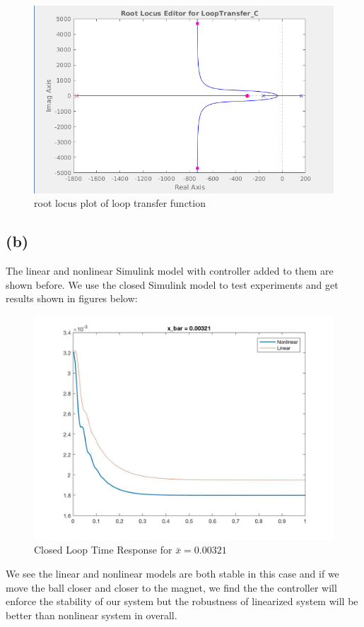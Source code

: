 \documentclass[letterpaper]{article}
\begin{document}
\begin{figure}[H]
	\centering
	\includegraphics[scale=0.5]{root_locus.png}
	\caption{root locus plot of loop transfer function}
\end{figure}
\subsection*{(b)}
The linear and nonlinear Simulink model with controller added to them are shown before. We use the closed Simulink model to test experiments and get results shown in figures below:
\begin{figure}[H]
	\centering
	\includegraphics[scale=0.25]{X_BAR323_control.jpg}
	\caption{Closed Loop Time Response for $\bar{x} = 0.00321$}
\end{figure}
We see the linear and nonlinear models are both stable in this case and if we move the ball closer and closer to the magnet, we find the the controller will enforce the stability of our system but the robustness of linearized system will be better than nonlinear system in overall.
\end{document}
